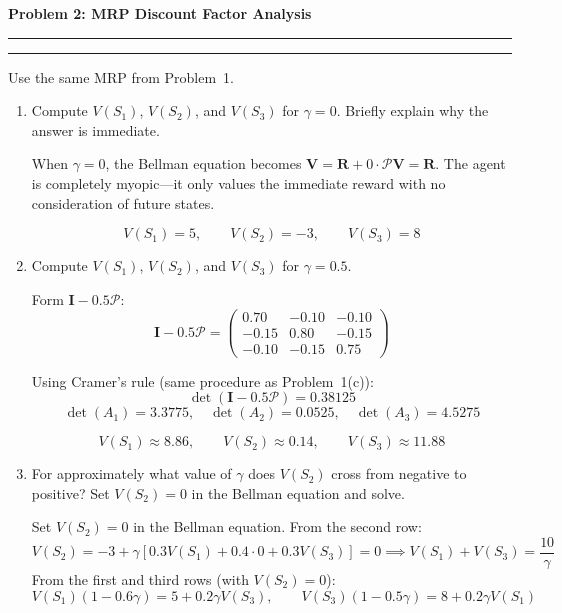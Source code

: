 \documentclass[12pt]{article}
\newcommand{\question}[1]{%
  \clearpage
  \vspace{0.5cm}
  {\noindent\normalsize \textbf{#1}}
  \vspace{0.2cm}
  \hrule
  \vspace{0.1cm}
  \hrule
  \vspace{0.3cm}
}
\begin{document}
\question{Problem 2: MRP Discount Factor Analysis}\label{prob:discount}

Use the same MRP from Problem~1.

\begin{enumerate}[label=(\alph*)]
\item Compute $V(S_1)$, $V(S_2)$, and $V(S_3)$ for $\gamma = 0$. Briefly explain why the answer is immediate.

\begin{stepbox}[Solution 2(a)]
When $\gamma = 0$, the Bellman equation becomes $\mathbf{V} = \mathbf{R} + 0 \cdot \mathcal{P}\mathbf{V} = \mathbf{R}$. The agent is completely myopic---it only values the immediate reward with no consideration of future states.
\end{stepbox}
\begin{resultsbox}
\[
\boxed{V(S_1) = 5, \qquad V(S_2) = -3, \qquad V(S_3) = 8}
\]
\end{resultsbox}

\item Compute $V(S_1)$, $V(S_2)$, and $V(S_3)$ for $\gamma = 0.5$.

\begin{stepbox}[Solution 2(b)]
Form $\mathbf{I} - 0.5\mathcal{P}$:
\[
\mathbf{I} - 0.5\mathcal{P} = \begin{pmatrix} 0.70 & -0.10 & -0.10 \\ -0.15 & 0.80 & -0.15 \\ -0.10 & -0.15 & 0.75 \end{pmatrix}
\]

Using Cramer's rule (same procedure as Problem~1(c)):
\[
\det(\mathbf{I} - 0.5\mathcal{P}) = 0.38125
\]
\[
\det(A_1) = 3.3775, \quad \det(A_2) = 0.0525, \quad \det(A_3) = 4.5275
\]
\end{stepbox}
\begin{resultsbox}
\[
\boxed{V(S_1) \approx 8.86}, \qquad \boxed{V(S_2) \approx 0.14}, \qquad \boxed{V(S_3) \approx 11.88}
\]
\end{resultsbox}

\item For approximately what value of $\gamma$ does $V(S_2)$ cross from negative to positive? Set $V(S_2) = 0$ in the Bellman equation and solve.

\begin{stepbox}
Set $V(S_2) = 0$ in the Bellman equation. From the second row:
\[
V(S_2) = -3 + \gamma[0.3V(S_1) + 0.4 \cdot 0 + 0.3V(S_3)] = 0 \implies V(S_1) + V(S_3) = \frac{10}{\gamma}
\]
From the first and third rows (with $V(S_2)=0$):
\[
V(S_1)(1 - 0.6\gamma) = 5 + 0.2\gamma V(S_3), \qquad V(S_3)(1 - 0.5\gamma) = 8 + 0.2\gamma V(S_1)
\]
\end{stepbox}


\end{enumerate}
\end{document}
